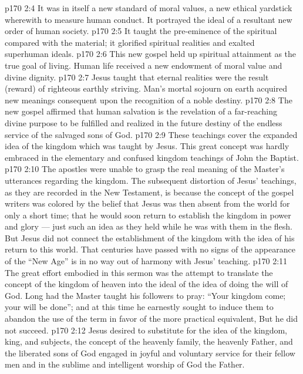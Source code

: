 \vs p170 2:4 \pc {}\bibnobreakspace It was in itself a new standard of moral values, a new ethical yardstick wherewith to measure human conduct. It portrayed the ideal of a resultant new order of human society.
\vs p170 2:5 \pc {}\bibnobreakspace It taught the pre\hyp{}eminence of the spiritual compared with the material; it glorified spiritual realities and exalted superhuman ideals.
\vs p170 2:6 \pc {}\bibnobreakspace This new gospel held up spiritual attainment as the true goal of living. Human life received a new endowment of moral value and divine dignity.
\vs p170 2:7 \pc {}\bibnobreakspace Jesus taught that eternal realities were the result (reward) of righteous earthly striving. Man’s mortal sojourn on earth acquired new meanings consequent upon the recognition of a noble destiny.
\vs p170 2:8 \pc {}\bibnobreakspace The new gospel affirmed that human salvation is the revelation of a far\hyp{}reaching divine purpose to be fulfilled and realized in the future destiny of the endless service of the salvaged sons of God.
\vs p170 2:9 \pc These teachings cover the expanded idea of the kingdom which was taught by Jesus. This great concept was hardly embraced in the elementary and confused kingdom teachings of John the Baptist.
\vs p170 2:10 The apostles were unable to grasp the real meaning of the Master’s utterances regarding the kingdom. The subsequent distortion of Jesus’ teachings, as they are recorded in the New Testament, is because the concept of the gospel writers was colored by the belief that Jesus was then absent from the world for only a short time; that he would soon return to establish the kingdom in power and glory --- just such an idea as they held while he was with them in the flesh. But Jesus did not connect the establishment of the kingdom with the idea of his return to this world. That centuries have passed with no signs of the appearance of the “New Age” is in no way out of harmony with Jesus’ teaching.
\vs p170 2:11 The great effort embodied in this sermon was the attempt to translate the concept of the kingdom of heaven into the ideal of the idea of doing the will of God. Long had the Master taught his followers to pray: \textcolor{ubdarkred}{“Your kingdom come; your will be done”;} and at this time he earnestly sought to induce them to abandon the use of the term  in favor of the more practical equivalent,  But he did not succeed.
\vs p170 2:12 Jesus desired to substitute for the idea of the kingdom, king, and subjects, the concept of the heavenly family, the heavenly Father, and the liberated sons of God engaged in joyful and voluntary service for their fellow men and in the sublime and intelligent worship of God the Father.
